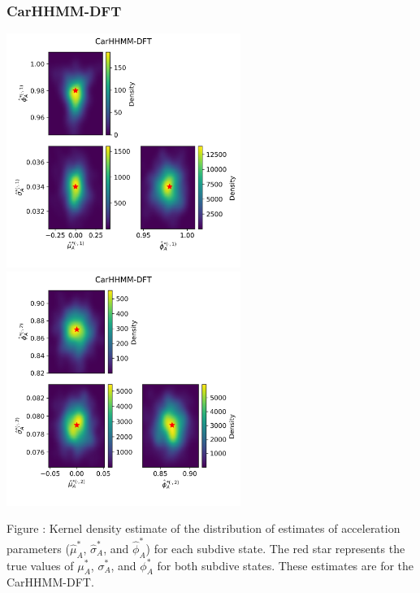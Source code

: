 \documentclass{article}
\begin{document}
        \subsubsection{CarHHMM-DFT}
        \begin{center}
        \includegraphics[width=3in]{../Plots/hhmm_FV_MLE_density_A_0_0.png}
        \includegraphics[width=3in]{../Plots/hhmm_FV_MLE_density_A_0_1.png}
        \end{center}
        
        \noindent Figure : Kernel density estimate of the distribution of estimates of acceleration parameters ($\hat \mu^*_A$, $\hat \sigma^*_A$, and $\hat \phi^*_A$) for each subdive state. The red star represents the true values of $\mu^*_A$, $\sigma^*_A$, and $\phi^*_A$ for both subdive states. These estimates are for the CarHHMM-DFT.
        \addtocounter{fignum}{1}
        
\end{document}
